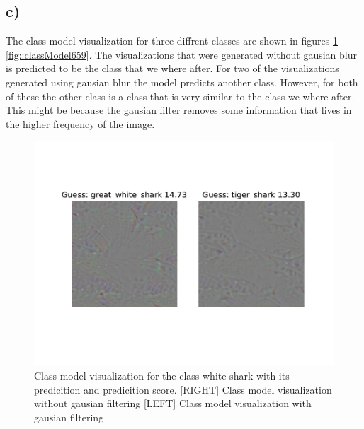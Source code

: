\documentclass{article}
\begin{document}
\subsection*{c)}
The class model visualization for three diffrent classes are shown in figures \ref{fig::classModel2}-\ref{fig::classModel659}. The visualizations that were generated without gausian blur is predicted to be the class that we where after. For two of the visualizations generated using gausian blur the model predicts another class. However, for both of these the other class is a class that is very similar to the class we where after. This might be because the gausian filter removes some information that lives in the higher frequency of the image.
\begin{figure}[h]
    \begin{center}
        \includegraphics{../Task2/Figures/2_visualized.pdf}
        \caption{Class model visualization for the class white shark with its predicition and predicition score. [RIGHT] Class model visualization without gausian filtering [LEFT] Class model visualization with gausian filtering}
        \label{fig::classModel2}
    \end{center}
\end{figure}
\end{document}
